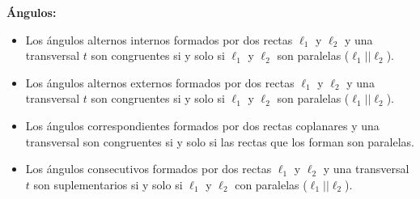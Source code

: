 \documentclass[•]{article}
\begin{document}
\begin{flushleft}
\textbf{\'Angulos:}
\begin{itemize}
\item Los \'angulos alternos internos formados por dos rectas $\ell_1$ y $\ell_2$ y una transversal $t$ son congruentes si y solo si $\ell_1$ y $\ell_2$ son paralelas ($\ell_1  ||  \ell_2$).

\item Los \'angulos alternos externos formados por dos rectas $\ell_1$ y $\ell_2$ y una transversal $t$ son congruentes si y solo si $\ell_1$ y $\ell_2$ son paralelas ($\ell_1 || \ell_2$).

\item Los \'angulos correspondientes formados por dos rectas coplanares y una transversal son congruentes si y solo si las rectas que los forman son paralelas.

\item Los \'angulos consecutivos formados por dos rectas $\ell_1$ y $\ell_2$ y una transversal $t$ son suplementarios si y solo si $\ell_1$ y $\ell_2$ con paralelas ($\ell_1  ||  \ell_2$).
\end{itemize}
\end{flushleft}
\end{document}
